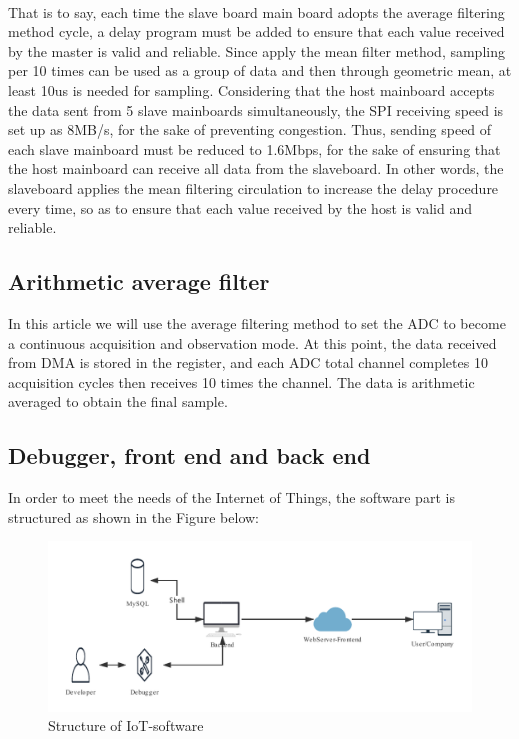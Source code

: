 \\
That is to say, each time the slave board main board adopts the average filtering method cycle, a delay program must be added to ensure that each value received by the master is valid and reliable.
Since apply the mean filter method, sampling per 10 times can be used as a group of data and then through geometric mean, at least 10us is needed for sampling. 
Considering that the host mainboard accepts the data sent from 5 slave mainboards simultaneously, the SPI receiving speed is set up as 8MB/s, for the sake of preventing congestion. 
Thus, sending speed of each slave mainboard must be reduced to 1.6Mbps, for the sake of ensuring that the host mainboard can receive all data from the slaveboard. 
In other words, the slaveboard applies the mean filtering circulation to increase the delay procedure every time, so as to ensure that each value received by the host is valid and reliable. 

\subsection{Arithmetic average filter}
\label{sec:Arithmetic average filter}

In this article we will use the average filtering method to set the ADC to become a continuous acquisition and observation mode. At this point, the data received from DMA is stored in the register, and each ADC total channel completes 10 acquisition cycles then receives 10 times the channel. The data is arithmetic averaged to obtain the final sample.

\subsection{Debugger, front end and back end}
\label{sec:Debugger, front end and back end}

In order to meet the needs of the Internet of Things, the software part is structured as shown in the Figure below:
\begin{figure}[!ht]
	\centering
	\includegraphics[width=16cm]{grafiken/5.7.pdf}
	\caption{Structure of IoT-software} 
	\label{fig:5.7}
\end{figure}
\FloatBarrier



